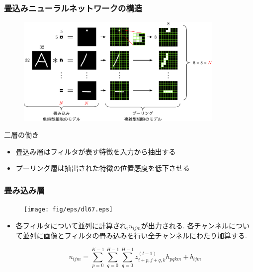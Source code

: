 \documentclass[dvipdfmx,11pt,notheorems]{beamer}
\theoremstyle{definition}
\begin{document}
\begin{frame}[fragile]\frametitle{畳込みニューラルネットワークの構造}

\begin{figure}[tb]
  \begin{center}
    \includegraphics[clip,width=10cm]{fig/eps/conv_pool.eps}
  \end{center}
\end{figure}

\begin{block}{二層の働き}
\begin{itemize}
\item 畳込み層はフィルタが表す特徴を入力から抽出する
\item プーリング層は抽出された特徴の位置感度を低下させる
\end{itemize}
\end{block}

\end{frame}



\begin{frame}[fragile]\frametitle{畳み込み層}

\begin{figure}[t]
 \centering
 \texttt{[image: fig/eps/dl67.eps]}
\end{figure}

\begin{itemize}
\item 各フィルタについて並列に計算され,$u_{ijm}$が出力される.
各チャンネルについて並列に画像とフィルタの畳み込みを行い全チャンネルにわたり加算する.

\begin{equation}
  u_{ijm} = \sum_{p=0}^{K-1} \sum_{q=0}^{H-1} \sum_{q=0}^{H-1} z_{i+p,j+q,k}^{(l-1)} h_{pqkm}+b_{ijm}
\end{equation}

\end{itemize}
\end{frame}
\end{document}
